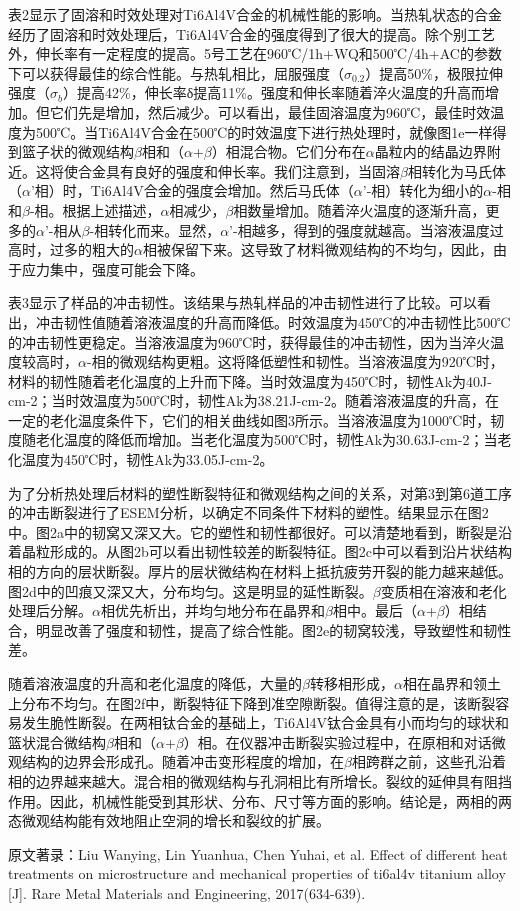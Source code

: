 表2显示了固溶和时效处理对Ti6Al4V合金的机械性能的影响。当热轧状态的合金经历了固溶和时效处理后，Ti6Al4V合金的强度得到了很大的提高。除个别工艺外，伸长率有一定程度的提高。5号工艺在960℃/1h+WQ和500℃/4h+AC的参数下可以获得最佳的综合性能。与热轧相比，屈服强度（$\sigma_{0.2}$）提高50\%，极限拉伸强度（$\sigma_b$）提高42\%，伸长率δ提高11\%。强度和伸长率随着淬火温度的升高而增加。但它们先是增加，然后减少。可以看出，最佳固溶温度为960℃，最佳时效温度为500℃。当Ti6Al4V合金在500℃的时效温度下进行热处理时，就像图1e一样得到篮子状的微观结构$\beta$相和（$\alpha$+$\beta$）相混合物。它们分布在$\alpha$晶粒内的结晶边界附近。这将使合金具有良好的强度和伸长率。我们注意到，当固溶$\beta$相转化为马氏体（$\alpha$'相）时，Ti6Al4V合金的强度会增加。然后马氏体（$\alpha$'-相）转化为细小的$\alpha$-相和$\beta$-相。根据上述描述，$\alpha$相减少，$\beta$相数量增加。随着淬火温度的逐渐升高，更多的$\alpha$'-相从$\beta$-相转化而来。显然，$\alpha$'-相越多，得到的强度就越高。当溶液温度过高时，过多的粗大的$\alpha$相被保留下来。这导致了材料微观结构的不均匀，因此，由于应力集中，强度可能会下降。



表3显示了样品的冲击韧性。该结果与热轧样品的冲击韧性进行了比较。可以看出，冲击韧性值随着溶液温度的升高而降低。时效温度为450℃的冲击韧性比500℃的冲击韧性更稳定。当溶液温度为960℃时，获得最佳的冲击韧性，因为当淬火温度较高时，$\alpha$-相的微观结构更粗。这将降低塑性和韧性。当溶液温度为920℃时，材料的韧性随着老化温度的上升而下降。当时效温度为450℃时，韧性Ak为40J-cm-2；当时效温度为500℃时，韧性Ak为38.21J-cm-2。随着溶液温度的升高，在一定的老化温度条件下，它们的相关曲线如图3所示。当溶液温度为1000℃时，韧度随老化温度的降低而增加。当老化温度为500℃时，韧性Ak为30.63J-cm-2；当老化温度为450℃时，韧性Ak为33.05J-cm-2。

为了分析热处理后材料的塑性断裂特征和微观结构之间的关系，对第3到第6道工序的冲击断裂进行了ESEM分析，以确定不同条件下材料的塑性。结果显示在图2中。图2a中的韧窝又深又大。它的塑性和韧性都很好。可以清楚地看到，断裂是沿着晶粒形成的。从图2b可以看出韧性较差的断裂特征。图2c中可以看到沿片状结构相的方向的层状断裂。厚片的层状微结构在材料上抵抗疲劳开裂的能力越来越低。图2d中的凹痕又深又大，分布均匀。这是明显的延性断裂。$\beta$变质相在溶液和老化处理后分解。$\alpha$相优先析出，并均匀地分布在晶界和$\beta$相中。最后（$\alpha$+$\beta$）相结合，明显改善了强度和韧性，提高了综合性能。图2e的韧窝较浅，导致塑性和韧性差。


随着溶液温度的升高和老化温度的降低，大量的$\beta$转移相形成，$\alpha$相在晶界和领土上分布不均匀。在图2f中，断裂特征下降到准空隙断裂。值得注意的是，该断裂容易发生脆性断裂。在两相钛合金的基础上，Ti6Al4V钛合金具有小而均匀的球状和篮状混合微结构$\beta$相和（$\alpha$+$\beta$）相。在仪器冲击断裂实验过程中，在原相和对话微观结构的边界会形成孔。随着冲击变形程度的增加，在$\beta$相跨群之前，这些孔沿着相的边界越来越大。混合相的微观结构与孔洞相比有所增长。裂纹的延伸具有阻挡作用。因此，机械性能受到其形状、分布、尺寸等方面的影响。结论是，两相的两态微观结构能有效地阻止空洞的增长和裂纹的扩展。

\begin{center}
	原文著录：Liu Wanying, Lin Yuanhua, Chen Yuhai, et al. Effect of different heat treatments on microstructure and mechanical properties of ti6al4v titanium alloy  [J]. Rare Metal Materials and Engineering, 2017(634-639).
\end{center}
